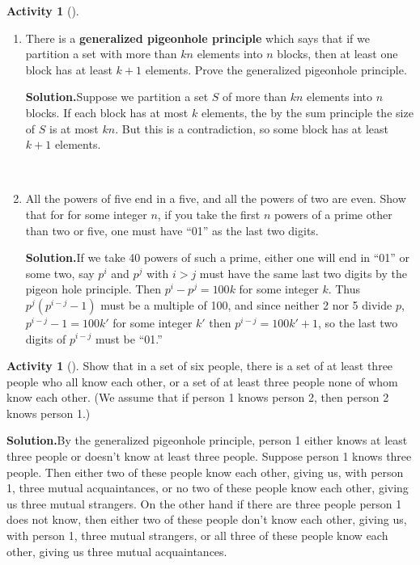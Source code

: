 \documentclass[10pt,]{book}
\newcommand{\terminology}[1]{\textbf{#1}}
\theoremstyle{plain}
\theoremstyle{definition}
\newtheorem{activity}[project]{Activity}
\numberwithin{equation}{chapter}
\begin{document}
\begin{activity}[]\label{activity-17}
~\par
\begin{enumerate}[label=(\alph*)]
 \item There is a \terminology{generalized pigeonhole principle} which says that if we partition a set with more than \(kn\) elements into \(n\) blocks, then at least one block has at least \(k+1\) elements. Prove the generalized pigeonhole principle.%
\par\medskip\noindent%
\textbf{Solution.}\quad Suppose we partition a set \(S\) of more than \(kn\) elements into \(n\) blocks. If each block has at most \(k\) elements, the by the sum principle the size of \(S\) is at most \(kn\). But this is a contradiction, so some block has at least \(k+1\) elements.%

~\par
\item All the powers of five end in a five, and all the powers of two are even. Show that for for some integer \(n\), if you take the first \(n\) powers of a prime other than two or five, one must have ``01'' as the last two digits.%
\par\medskip\noindent%
\textbf{Solution.}\quad If we take 40 powers of such a prime, either one will end in ``01'' or some two, say \(p^i\) and \(p^j\) with \(i>j\) must have the same last two digits by the pigeon hole principle. Then \(p^i-p^j=100k\) for some integer \(k\). Thus \(p^j(p^{i-j} -1)\) must be a multiple of 100, and since neither 2 nor 5 divide \(p\), \(p^{i-j} -1 = 100k'\) for some integer \(k'\) then \(p^{i-j} = 100k'+1\), so the last two digits of \(p^{i-j}\) must be ``01.''%

\end{enumerate}
\end{activity}
\begin{activity}[]\label{R_3_3_}
Show that in a set of six people, there is a set of at least three people who all know each other, or a set of at least three people none of whom know each other. (We assume that if person 1 knows person 2, then person 2 knows person 1.)%
\par\medskip\noindent%
\textbf{Solution.}\quad By the generalized pigeonhole principle, person 1 either knows at least three people or doesn't know at least three people. Suppose person 1 knows three people. Then either two of these people know each other, giving us, with person 1, three mutual acquaintances, or no two of these people know each other, giving us three mutual strangers. On the other hand if there are three people person 1 does not know, then either two of these people don't know each other, giving us, with person 1, three mutual strangers, or all three of these people know each other, giving us three mutual acquaintances.%
\end{activity}
\end{document}
